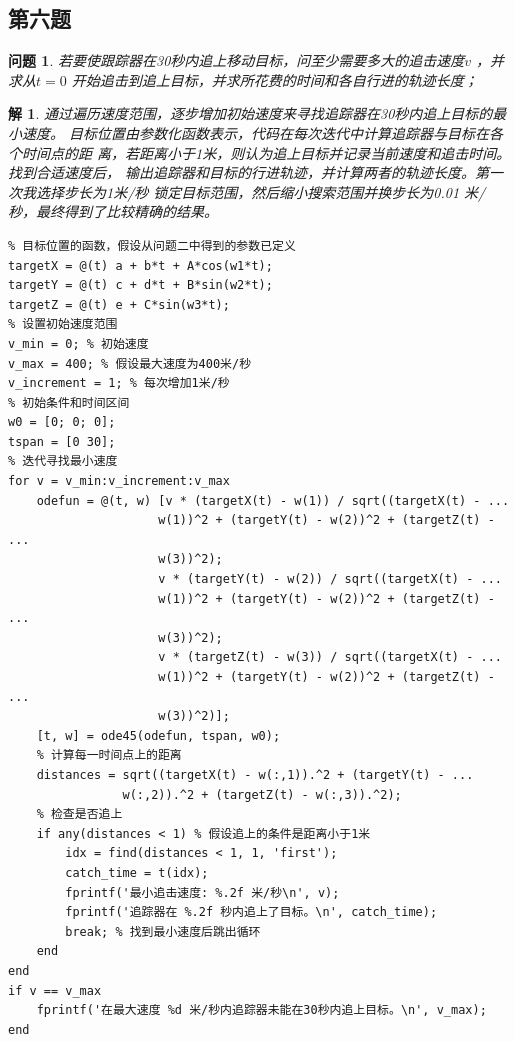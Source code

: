 \documentclass[a4paper, 12pt]{ctexart}
\newtheorem*{theorem}{解}
\newtheorem*{example}{问题}
\begin{document}
\subsection{第六题}

\begin{example}
    若要使跟踪器在30秒内追上移动目标，问至少需要多大的追击速度$v$ ，并求从$t=0$
    开始追击到追上目标，并求所花费的时间和各自行进的轨迹长度；
\end{example}

\begin{theorem}
    通过遍历速度范围，逐步增加初始速度来寻找追踪器在30秒内追上目标的最小速度。
    目标位置由参数化函数表示，代码在每次迭代中计算追踪器与目标在各个时间点的距
    离，若距离小于1米，则认为追上目标并记录当前速度和追击时间。找到合适速度后，
    输出追踪器和目标的行进轨迹，并计算两者的轨迹长度。第一次我选择步长为1米/秒
    锁定目标范围，然后缩小搜索范围并换步长为0.01 米/秒，最终得到了比较精确的结果。
    \begin{lstlisting}
% 目标位置的函数，假设从问题二中得到的参数已定义
targetX = @(t) a + b*t + A*cos(w1*t);
targetY = @(t) c + d*t + B*sin(w2*t);
targetZ = @(t) e + C*sin(w3*t);
% 设置初始速度范围
v_min = 0; % 初始速度
v_max = 400; % 假设最大速度为400米/秒
v_increment = 1; % 每次增加1米/秒
% 初始条件和时间区间
w0 = [0; 0; 0];
tspan = [0 30];
% 迭代寻找最小速度
for v = v_min:v_increment:v_max
    odefun = @(t, w) [v * (targetX(t) - w(1)) / sqrt((targetX(t) - ...
                     w(1))^2 + (targetY(t) - w(2))^2 + (targetZ(t) - ... 
                     w(3))^2);
                     v * (targetY(t) - w(2)) / sqrt((targetX(t) - ...
                     w(1))^2 + (targetY(t) - w(2))^2 + (targetZ(t) - ...
                     w(3))^2);
                     v * (targetZ(t) - w(3)) / sqrt((targetX(t) - ...
                     w(1))^2 + (targetY(t) - w(2))^2 + (targetZ(t) - ...
                     w(3))^2)];
    [t, w] = ode45(odefun, tspan, w0);
    % 计算每一时间点上的距离
    distances = sqrt((targetX(t) - w(:,1)).^2 + (targetY(t) - ...
                w(:,2)).^2 + (targetZ(t) - w(:,3)).^2);
    % 检查是否追上
    if any(distances < 1) % 假设追上的条件是距离小于1米
        idx = find(distances < 1, 1, 'first');
        catch_time = t(idx);
        fprintf('最小追击速度: %.2f 米/秒\n', v);
        fprintf('追踪器在 %.2f 秒内追上了目标。\n', catch_time);
        break; % 找到最小速度后跳出循环
    end
end
if v == v_max
    fprintf('在最大速度 %d 米/秒内追踪器未能在30秒内追上目标。\n', v_max);
end


\end{lstlisting}
\end{theorem}
\end{document}
